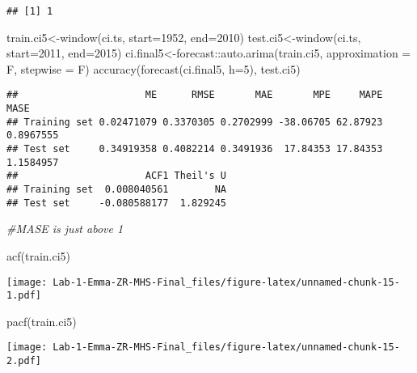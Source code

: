 \documentclass[
]{article}
\newenvironment{Shaded}{\begin{snugshade}}{\end{snugshade}}
\newcommand{\AttributeTok}[1]{\textcolor[rgb]{0.77,0.63,0.00}{#1}}
\newcommand{\CommentTok}[1]{\textcolor[rgb]{0.56,0.35,0.01}{\textit{#1}}}
\newcommand{\DecValTok}[1]{\textcolor[rgb]{0.00,0.00,0.81}{#1}}
\newcommand{\FunctionTok}[1]{\textcolor[rgb]{0.00,0.00,0.00}{#1}}
\newcommand{\NormalTok}[1]{#1}
\newcommand{\OtherTok}[1]{\textcolor[rgb]{0.56,0.35,0.01}{#1}}
\newcommand{\SpecialCharTok}[1]{\textcolor[rgb]{0.00,0.00,0.00}{#1}}
\begin{document}
\begin{verbatim}
## [1] 1
\end{verbatim}

\begin{Shaded}
\begin{Highlighting}[]
\NormalTok{train.ci5}\OtherTok{\textless{}{-}}\FunctionTok{window}\NormalTok{(ci.ts, }\AttributeTok{start=}\DecValTok{1952}\NormalTok{, }\AttributeTok{end=}\DecValTok{2010}\NormalTok{)}
\NormalTok{test.ci5}\OtherTok{\textless{}{-}}\FunctionTok{window}\NormalTok{(ci.ts, }\AttributeTok{start=}\DecValTok{2011}\NormalTok{, }\AttributeTok{end=}\DecValTok{2015}\NormalTok{)}
\NormalTok{ci.final5}\OtherTok{\textless{}{-}}\NormalTok{forecast}\SpecialCharTok{::}\FunctionTok{auto.arima}\NormalTok{(train.ci5, }\AttributeTok{approximation =}\NormalTok{ F, }\AttributeTok{stepwise =}\NormalTok{ F)}
\FunctionTok{accuracy}\NormalTok{(}\FunctionTok{forecast}\NormalTok{(ci.final5, }\AttributeTok{h=}\DecValTok{5}\NormalTok{), test.ci5)}
\end{Highlighting}
\end{Shaded}

\begin{verbatim}
##                      ME      RMSE       MAE       MPE     MAPE      MASE
## Training set 0.02471079 0.3370305 0.2702999 -38.06705 62.87923 0.8967555
## Test set     0.34919358 0.4082214 0.3491936  17.84353 17.84353 1.1584957
##                      ACF1 Theil's U
## Training set  0.008040561        NA
## Test set     -0.080588177  1.829245
\end{verbatim}

\begin{Shaded}
\begin{Highlighting}[]
\CommentTok{\#MASE is just above 1}

\FunctionTok{acf}\NormalTok{(train.ci5)}
\end{Highlighting}
\end{Shaded}

\texttt{[image: Lab-1-Emma-ZR-MHS-Final\_files/figure-latex/unnamed-chunk-15-1.pdf]}

\begin{Shaded}
\begin{Highlighting}[]
\FunctionTok{pacf}\NormalTok{(train.ci5)}
\end{Highlighting}
\end{Shaded}

\texttt{[image: Lab-1-Emma-ZR-MHS-Final\_files/figure-latex/unnamed-chunk-15-2.pdf]}
\end{document}
